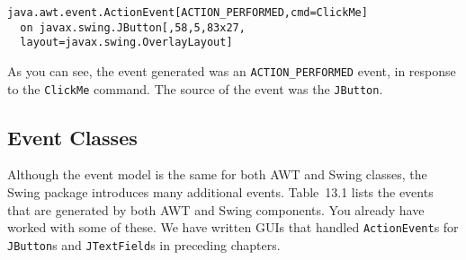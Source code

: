 \begin{jjjlisting}
\begin{lstlisting}
java.awt.event.ActionEvent[ACTION_PERFORMED,cmd=ClickMe]
  on javax.swing.JButton[,58,5,83x27,
  layout=javax.swing.OverlayLayout]
\end{lstlisting}
\end{jjjlisting}

\noindent As you can see, the event generated was an {\tt ACTION\_PERFORMED}
event, in response to the {\tt ClickMe} command.  The source of the event
was the {\tt JButton}.

\subsection{Event Classes}

\noindent Although the event model is the same for both AWT and Swing
classes, the Swing package introduces many additional events.
Table~13.1 lists the events that are generated by both AWT and Swing
components.  You already have worked with some of these. We have
written GUIs that handled {\tt ActionEvent}s for {\tt JButton}s and
{\tt JTextField}s in preceding chapters.

